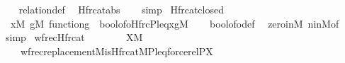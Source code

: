 \begin{isabellebody}
%
\isadelimproof
\ \ %
\endisadelimproof
%
\isatagproof
{}\isamarkupfalse%
\ relation{}{\isacharunderscore}{\kern0pt}def\ \isamarkupfalse%
\ Hfrc{\isacharunderscore}{\kern0pt}at{\isacharunderscore}{\kern0pt}abs\isanewline
\ \ \isamarkupfalse%
\ simp%
\endisatagproof
{\isafoldproof}%
%
\isadelimproof
\isanewline
%
\endisadelimproof
\isanewline
{}\isamarkupfalse%
\ Hfrc{\isacharunderscore}{\kern0pt}at{\isacharunderscore}{\kern0pt}closed\ {\isacharcolon}{\kern0pt}\isanewline
\ \ {\isachardoublequoteopen}{\isasymforall}x{\isasymin}M{\isachardot}{\kern0pt}\ {\isasymforall}g{\isasymin}M{\isachardot}{\kern0pt}\ function{\isacharparenleft}{\kern0pt}g{\isacharparenright}{\kern0pt}\ {\isasymlongrightarrow}\ bool{\isacharunderscore}{\kern0pt}of{\isacharunderscore}{\kern0pt}o{\isacharparenleft}{\kern0pt}Hfrc{\isacharparenleft}{\kern0pt}P{\isacharcomma}{\kern0pt}leq{\isacharcomma}{\kern0pt}x{\isacharcomma}{\kern0pt}g{\isacharparenright}{\kern0pt}{\isacharparenright}{\kern0pt}{\isasymin}M{\isachardoublequoteclose}\isanewline
%
\isadelimproof
\ \ %
\endisadelimproof
%
\isatagproof
{}\isamarkupfalse%
\ bool{\isacharunderscore}{\kern0pt}of{\isacharunderscore}{\kern0pt}o{\isacharunderscore}{\kern0pt}def\ \isamarkupfalse%
\ zero{\isacharunderscore}{\kern0pt}in{\isacharunderscore}{\kern0pt}M\ n{\isacharunderscore}{\kern0pt}in{\isacharunderscore}{\kern0pt}M{\isacharbrackleft}{\kern0pt}of\ {}{\isacharbrackright}{\kern0pt}\ \isamarkupfalse%
\ simp%
\endisatagproof
{\isafoldproof}%
%
\isadelimproof
\isanewline
%
\endisadelimproof
\isanewline
{}\isamarkupfalse%
\ wfrec{\isacharunderscore}{\kern0pt}Hfrc{\isacharunderscore}{\kern0pt}at\ {\isacharcolon}{\kern0pt}\isanewline
\ \ \isanewline
\ \ \ \ {\isachardoublequoteopen}X{\isasymin}M{\isachardoublequoteclose}\isanewline
\ \ \isanewline
\ \ \ \ {\isachardoublequoteopen}wfrec{\isacharunderscore}{\kern0pt}replacement{\isacharparenleft}{\kern0pt}{\isacharhash}{\kern0pt}{\isacharhash}{\kern0pt}M{\isacharcomma}{\kern0pt}is{\isacharunderscore}{\kern0pt}Hfrc{\isacharunderscore}{\kern0pt}at{\isacharparenleft}{\kern0pt}{\isacharhash}{\kern0pt}{\isacharhash}{\kern0pt}M{\isacharcomma}{\kern0pt}P{\isacharcomma}{\kern0pt}leq{\isacharparenright}{\kern0pt}{\isacharcomma}{\kern0pt}forcerel{\isacharparenleft}{\kern0pt}P{\isacharcomma}{\kern0pt}X{\isacharparenright}{\kern0pt}{\isacharparenright}{\kern0pt}{\isachardoublequoteclose}\isanewline
%
\isadelimproof

\end{isabellebody}
